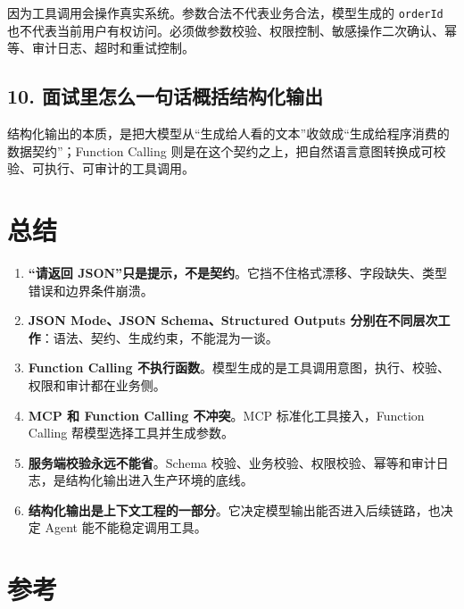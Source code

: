 \documentclass[10pt,a4paper]{ctexart}
\begin{document}
因为工具调用会操作真实系统。参数合法不代表业务合法，模型生成的 \texttt{orderId} 也不代表当前用户有权访问。必须做参数校验、权限控制、敏感操作二次确认、幂等、审计日志、超时和重试控制。



\subsection{10. 面试里怎么一句话概括结构化输出}


结构化输出的本质，是把大模型从“生成给人看的文本”收敛成“生成给程序消费的数据契约”；Function Calling 则是在这个契约之上，把自然语言意图转换成可校验、可执行、可审计的工具调用。



\section{总结}

\begin{enumerate}[itemsep=2pt, topsep=4pt]
  \item \textbf{“请返回 JSON”只是提示，不是契约}。它挡不住格式漂移、字段缺失、类型错误和边界条件崩溃。
  \item \textbf{JSON Mode、JSON Schema、Structured Outputs 分别在不同层次工作}：语法、契约、生成约束，不能混为一谈。
  \item \textbf{Function Calling 不执行函数}。模型生成的是工具调用意图，执行、校验、权限和审计都在业务侧。
  \item \textbf{MCP 和 Function Calling 不冲突}。MCP 标准化工具接入，Function Calling 帮模型选择工具并生成参数。
  \item \textbf{服务端校验永远不能省}。Schema 校验、业务校验、权限校验、幂等和审计日志，是结构化输出进入生产环境的底线。
  \item \textbf{结构化输出是上下文工程的一部分}。它决定模型输出能否进入后续链路，也决定 Agent 能不能稳定调用工具。
\end{enumerate}


\section{参考}
\end{document}
